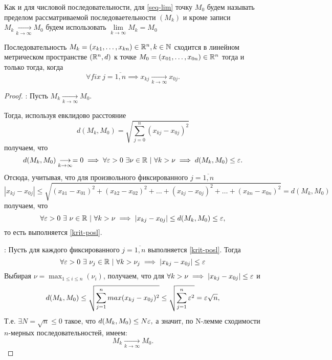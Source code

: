 \documentclass[../../main.tex]{subfiles}
\begin{document}
  Как и для числовой последовательности, для \eqref{seq-lim} точку 
  $M_0$ будем называть пределом рассматриваемой последоваетельности 
  $(M_k)$ и кроме записи $M_k \underset{k\rightarrow\infty}
  {\longrightarrow}  M_0$ будем использовать $ \lim\limits_{k \to 
  \infty}{M_k} = M_0$
  \begin{thm}
    Последовательность $M_k = (x_{k1}, \dots, x_{kn}) \in \mathbb{R}^n, k 
    \in \mathbb{N}$ сходится в линейном метрическом пространстве $(\mathbb{R}^n, d)$ 
    к точке $M_0 = (x_{01}, \dots, x_{0n}) \in \mathbb{R}^n$ тогда и только 
    тогда, когда
    \begin{equation}
    \label{krit-posl}
      \forall fix\ j = \overline{1, n} \implies
      x_{kj}\underset{k\rightarrow\infty}{\longrightarrow} x_{0j}.
    \end{equation}
  \end{thm}
  \begin{proof}
    \quad
    
    \nec: 
    Пусть $M_k \underset{k\rightarrow\infty}{\longrightarrow}  M_0$.
    
    Тогда, используя евклидово расстояние 
    \[
      d(M_k, M_0) = \sqrt{\sum_{j = 0}^{n}{(x_{kj} - x_{0j})^2}}
    \]
    получаем, что
    \[
      d(M_k, M_0) \underset{k\rightarrow\infty}{\longrightarrow} = 0 
      \implies
      \forall \varepsilon > 0\ \exists \nu \in \mathbb{R}\ |\ \forall k > \nu 
      \implies d(M_k, M_0) \leq \varepsilon.
    \]
    Отсюда, учитывая, что для произвольного фиксированного $j = 
    \overline{1, n}$
    \[
      |x_{kj} - x_{0j}| \leq \sqrt{(x_{k1} - x_{01})^2 + (x_{k2} - 
      x_{02})^2 + \dots + (x_{kj} - x_{0j})^2 + \dots + (x_{kn} - 
      x_{0n})^2} = d(M_k, M_0) 
    \]
    получаем, что 
    \[
      \forall \varepsilon > 0\ \exists\ \nu \in \mathbb{R}\ |\ \forall k > \nu 
      \implies |x_{kj} - x_{0j}| \leq d(M_k, M_0) \leq \varepsilon,
    \]
    то есть выполняется \eqref{krit-posl}.
    
    \bigskip
    
    \suff: Пусть для каждого фиксированного $j = \overline{1, n}$ 
    выполняется \eqref{krit-posl}. Тогда
    \[
      \forall \eps > 0\ \exists\ \nu_j \in \R\ |\ \forall k > \nu_j 
      \implies |x_{kj} - x_{0j}| \leq \eps
    \]
    Выбирая $\displaystyle\nu = \max_{1 \le i \le n}(\nu_i)$, 
    получаем, что для $\forall k > \nu \implies |x_{kj} - x_{0j}| 
    \leq \varepsilon$
     и 
     \[
       d(M_k, M_0) \leq \sqrt{\sum_{j = 1}^{n}{max(x_{kj} - 
       x_{0j})^2}} \leq \sqrt{\sum_{j = 1}^{n}{\varepsilon^2}} = 
       \varepsilon\sqrt{n}, 
     \]
     Т.е. $\exists N = \sqrt{n} \leq 0$ такое, что $d(M_k, M_0) \leq 
     N \varepsilon,$ а значит, по N-лемме сходимости $n$-мерных 
     последовательностей, имеем:
     \[
       M_k \underset{k\rightarrow\infty}{\longrightarrow}  M_0.
     \]
  \end{proof}
\end{document}
